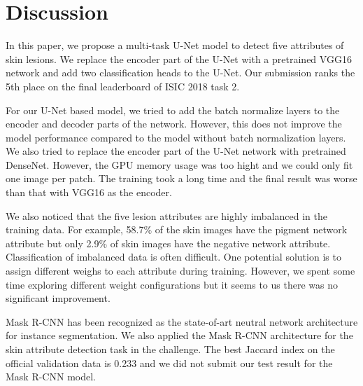 \documentclass{article}
\begin{document}


\section{Discussion}
In this paper, we propose a multi-task U-Net model to detect five attributes of skin lesions. We replace the encoder part of the U-Net with a pretrained VGG16 network and add two classification heads to the U-Net. Our submission ranks the 5th place on the final leaderboard of ISIC 2018 task 2. 

For our U-Net based model, we tried to add the batch normalize layers to the encoder and decoder parts of the network. However, this does not improve the model performance compared to the model without batch normalization layers. We also tried to replace the encoder part of the U-Net network with pretrained DenseNet. However, the GPU memory usage was too hight and we could only fit one image per patch. The training took a long time and the final result was worse than that with VGG16 as the encoder. 

We also noticed that the five lesion attributes are highly imbalanced in the training data. For example, 58.7\% of the skin images have the pigment network attribute but only 2.9\% of skin images have the negative network attribute. Classification of imbalanced data is often difficult. One potential solution is to assign different weighs to each attribute during training. However, we spent some time exploring different weight configurations but it seems to us there was no significant improvement. 

Mask R-CNN has been recognized as the state-of-art neutral network architecture for instance segmentation.  We also applied the Mask R-CNN architecture for the skin attribute detection task in the challenge. The best Jaccard index on the official validation data is 0.233 and we did not submit our test result for the Mask R-CNN model. 



\end{document}
